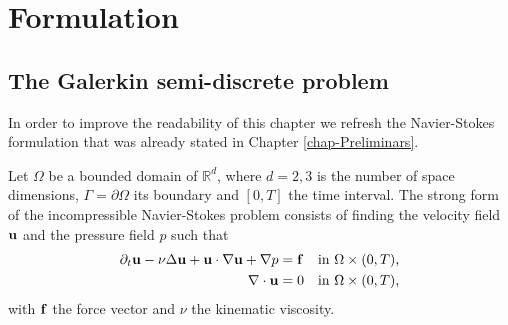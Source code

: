 

\section{Formulation}
\label{sec-C4_formulation}
\subsection{The Galerkin semi-discrete problem}
\label{subsec-C4_C4_NS_formulation}
In order to improve the readability of this chapter we refresh the Navier-Stokes formulation that was already stated in Chapter \ref{chap-Preliminars}. 

Let $\Omega$ be a bounded domain of $\mathbb{R}^d$, where $d=2,3$ is the number of space dimensions, $\Gamma=\partial\Omega$ its boundary and $[0,T]$ the time interval. The strong form of the incompressible Navier-Stokes problem consists of finding the velocity field ${\bf u}$ and the pressure field $p$ such that 
\begin{align}
\label{eq-C4_NS_strong_mome}
\partial_t{\bf u}-\nu\Delta{\bf u}+{\bf u}\cdot\nabla{\bf u}+\nabla p&={\bf f}&\mbox{in $\Omega\times(0,T)$,}\\
\label{eq-C4_NS_strong_inc}
\nabla\cdot{\bf u}&=0&\mbox{in $\Omega\times(0,T)$,}
\end{align}
with ${\bf f}$ the force vector and $\nu$ the kinematic viscosity. 

